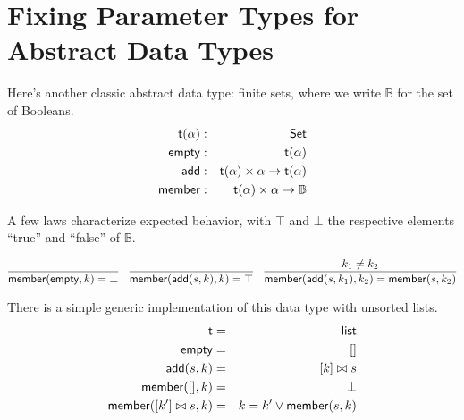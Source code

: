 \documentclass{amsbook}
\theoremstyle{definition}
\theoremstyle{remark}
\numberwithin{section}{chapter}
\numberwithin{equation}{chapter}
\begin{document}
\section{Fixing Parameter Types for Abstract Data Types}

Here's another classic abstract data type: finite sets, where we write $\mathbb B$ for the set of Booleans.
\begin{eqnarray*}
  \mathsf{t}(\alpha) &:& \mathsf{Set} \\
  \mathsf{empty} &:& \mathsf{t}(\alpha) \\
  \mathsf{add} &:& \mathsf{t}(\alpha) \times \alpha \to \mathsf{t}(\alpha) \\
  \mathsf{member} &:& \mathsf{t}(\alpha) \times \alpha \to \mathbb B
\end{eqnarray*}

A few laws characterize expected behavior, with $\top$ and $\bot$ the respective elements ``true'' and ``false'' of $\mathbb B$.

$$\infer{\mt{member}(\mt{empty}, k) = \bot}{}
\quad \infer{\mt{member}(\mt{add}(s, k), k) = \top}{}
\quad \infer{\mt{member}(\mt{add}(s, k_1), k_2) = \mt{member}(s, k_2)}{k_1 \neq k_2}$$

There is a simple generic implementation of this data type with unsorted lists.
\begin{eqnarray*}
  \mathsf{t} &=& \mathsf{list} \\
  \mathsf{empty} &=& [] \\
  \mathsf{add}(s, k) &=& [k] \bowtie s \\
  \mathsf{member}([], k) &=& \bot \\
  \mathsf{member}([k'] \bowtie s, k) &=& k = k' \lor \mathsf{member}(s, k)
\end{eqnarray*}
\end{document}
